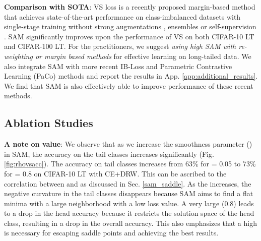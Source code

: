 \documentclass{article}
\begin{document}
\textbf{Comparison with SOTA}: VS loss \cite{kini2021label} is a recently proposed margin-based method that achieves state-of-the-art performance on class-imbalanced datasets with single-stage training without strong augmentations \cite{zhong2021improving}, ensembles \cite{zhang2021test} or self-supervision \cite{yang2020rethinking}. SAM significantly improves upon the performance of VS on both CIFAR-10 LT and CIFAR-100 LT. For the practitioners, we suggest \emph{using high  SAM with re-weighting or margin based methods} for effective learning on long-tailed data. We also integrate SAM with more recent IB-Loss \cite{Park_2021_ICCV} and Parametric Contrastive Learning (PaCo) \cite{cui2021parametric} methods and report the results in App. \ref{app:additional_results}. We find that SAM is also effectively able to improve performance of these recent methods.  
    
    



    


    






\subsection{Ablation Studies}
\label{subsec:ablation}
\textbf{A note on  value}:
We observe that as we increase the smoothness parameter () in SAM, the accuracy on the tail classes increases significantly (Fig. \ref{fig:rhovsacc}). The accuracy on tail classes increases from 63\% for  = 0.05 to 73\% for  = 0.8 on CIFAR-10 LT with CE+DRW. This can be ascribed to the correlation between  and  as discussed in Sec. \ref{sam_saddle}. As the  increases, the negative curvature in the tail classes disappears because SAM aims to find a flat minima with a large neighborhood with a low loss value. A very large  (0.8) leads to a drop in the head accuracy because it restricts the solution space of the head class, resulting in a drop in the overall accuracy. This also emphasizes that a high  is necessary for escaping saddle points and achieving the best results.
\end{document}
